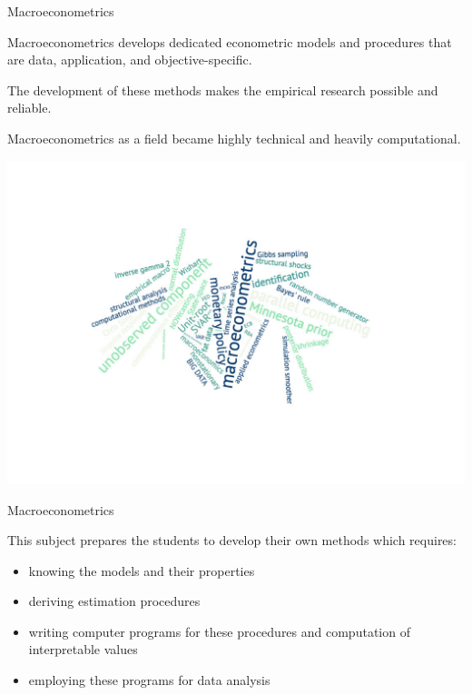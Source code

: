 \documentclass[notes,blackandwhite,mathsans]{beamer}
\begin{document}
{
\begin{frame}{\color{mcxs1}Macroeconometrics}

Macroeconometrics develops dedicated econometric models and procedures that are data, application, and objective-specific.

\bigskip The development of these methods makes the empirical research possible and reliable.
 
\bigskip Macroeconometrics as a field became highly technical and heavily computational.

\end{frame}
}





\begin{frame}

\includegraphics[scale=0.65, trim= 6cm 0cm 0cm 3cm]{grphs/mcxs-wordcloud4.pdf}

\end{frame}




{
\begin{frame}{\color{mcxs1}Macroeconometrics}

\bigskip This subject prepares the students to develop their own methods which requires:

\begin{itemize}
\item {\color{mcxs1}knowing the models} {\color{mcxs2}and their properties}
\item {\color{mcxs1}deriving} {\color{mcxs2}estimation procedures}
\item {\color{mcxs1}writing computer programs} {\color{mcxs2}for these procedures and computation of interpretable values}
\item {\color{mcxs1}employing} {\color{mcxs2}these programs for data analysis}
\end{itemize}

\end{frame}
}
\end{document}

